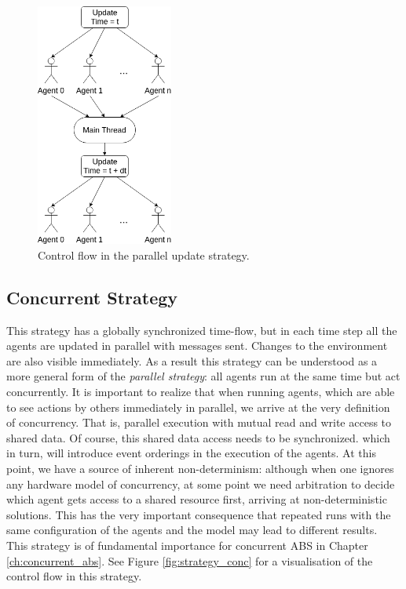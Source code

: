 \begin{figure}[H]
	\centering
	\includegraphics[width=0.4\textwidth, angle=0]{./fig/implabs/parallel.png}
	\caption[Control flow in the parallel update strategy]{Control flow in the parallel update strategy.}
	\label{fig:strategy_par}
\end{figure}

\subsection{Concurrent Strategy}
\label{sub:con_strategy}
This strategy has a globally synchronized time-flow, but in each time step all the agents are updated in parallel with messages sent. Changes to the environment are also visible immediately. As a result this strategy can be understood as a more general form of the \textit{parallel strategy}: all agents run at the same time but act concurrently. It is important to realize that when running agents, which are able to see actions by others immediately in parallel, we arrive at the very definition of concurrency. That is, parallel execution with mutual read and write access to shared data. Of course, this shared data access needs to be synchronized. which in turn, will introduce event orderings in the execution of the agents. At this point, we have a source of inherent non-determinism: although when one ignores any hardware model of concurrency, at some point we need arbitration to decide which agent gets access to a shared resource first, arriving at non-deterministic solutions. This has the very important consequence that repeated runs with the same configuration of the agents and the model may lead to different results. This strategy is of fundamental importance for concurrent ABS in Chapter \ref{ch:concurrent_abs}. See Figure \ref{fig:strategy_conc} for a visualisation of the control flow in this strategy.

